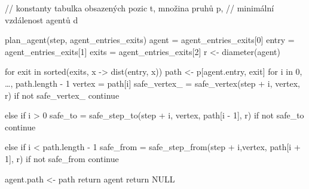 \begin{code}
// konstanty tabulka obsazených pozic t, množina pruhů p,
// minimální vzdálenost agentů d

plan_agent(step, agent_entries_exits)
  agent = agent_entries_exits[0]
  entry = agent_entries_exits[1]
  exits = agent_entries_exits[2]
  r <- diameter(agent)

  for exit in sorted(exits, x -> dist(entry, x))
    path <- p[agent.entry, exit]
    for i in 0, \ldots, path.length - 1
      vertex = path[i]
      safe_vertex_ = safe_vertex(step + i, vertex, r)
      if not safe_vertex_
        continue

      else if i > 0
        safe_to = safe_step_to(step + i, vertex, path[i - 1], r)
        if not safe_to
          continue

      else if i < path.length - 1
        safe_from = safe_step_from(step + i,vertex, path[i + 1], r)
        if not safe_from
          continue

    agent.path <- path
    return agent
  return NULL
\end{code}
